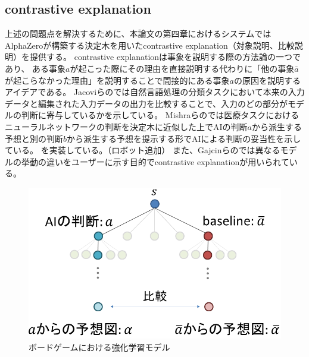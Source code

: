 \subsection{contrastive explanation}
上述の問題点を解決するために、本論文の第四章におけるシステムではAlphaZeroが構築する決定木を用いたcontrastive explanation（対象説明、比較説明）を提供する。
contrastive explanationは事象を説明する際の方法論の一つであり、
ある事象$a$が起こった際にその理由を直接説明する代わりに「他の事象$\bar{a}$が起こらなかった理由」を説明することで間接的にある事象$a$の原因を説明するアイデアである\cite{contrastive}。
Jacoviらの\cite{contrastive}では自然言語処理の分類タスクにおいて本来の入力データと編集された入力データの出力を比較することで、入力のどの部分がモデルの判断に寄与しているかを示している。
Mishraらの\cite{whyNot}では医療タスクにおけるニューラルネットワークの判断を決定木に近似した上でAIの判断$a$から派生する予想と別の判断$b$から派生する予想を提示する形でAIによる判断の妥当性を示している。
を実装している。（ロボット追加）
また、Gajcinらの\cite{preference}では異なるモデルの挙動の違いをユーザーに示す目的でcontrastive explanationが用いられている。
\begin{figure}[t]
	\centering
	\includegraphics[width=\linewidth]{./figure/contrastive.png}
	\caption{ボードゲームにおける強化学習モデル}
	\label{fig:contrastive}
\end{figure}
